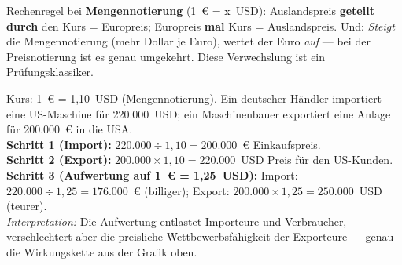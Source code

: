 \documentclass[11pt, a4paper]{article}
\begin{document}
\begin{center}
\end{center}

\begin{achtung}
Rechenregel bei \textbf{Mengennotierung} (1~€ = x~USD): Auslandspreis \textbf{geteilt
durch} den Kurs = Europreis; Europreis \textbf{mal} Kurs = Auslandspreis. Und:
\emph{Steigt} die Mengennotierung (mehr Dollar je Euro), wertet der Euro \emph{auf} ---
bei der Preisnotierung ist es genau umgekehrt. Diese Verwechslung ist ein
Prüfungsklassiker.
\end{achtung}

\begin{beispiel}
Kurs: 1~€ = 1,10~USD (Mengennotierung). Ein deutscher Händler importiert eine
US-Maschine für 220.000~USD; ein Maschinenbauer exportiert eine Anlage für 200.000~€
in die USA.\\[0.3em]
\textbf{Schritt 1 (Import):} $220.000 \div 1{,}10 = 200.000$~€ Einkaufspreis.\\
\textbf{Schritt 2 (Export):} $200.000 \times 1{,}10 = 220.000$~USD Preis für den
US-Kunden.\\
\textbf{Schritt 3 (Aufwertung auf 1~€ = 1,25~USD):} Import: $220.000 \div 1{,}25 =
176.000$~€ (billiger); Export: $200.000 \times 1{,}25 = 250.000$~USD (teurer).\\[0.3em]
\emph{Interpretation:} Die Aufwertung entlastet Importeure und Verbraucher, verschlechtert
aber die preisliche Wettbewerbsfähigkeit der Exporteure --- genau die Wirkungskette aus
der Grafik oben.
\end{beispiel}
\end{document}
